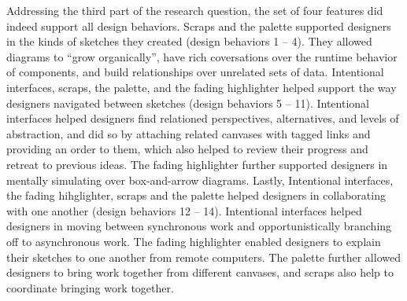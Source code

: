 Addressing the third part of the research question, the set of four features did indeed support all design behaviors. Scraps and the palette supported designers in the kinds of sketches they created (design behaviors 1 -- 4). They allowed diagrams to ``grow organically'', have rich coversations over the runtime behavior of components, and build relationships over unrelated sets of data. Intentional interfaces, scraps, the palette, and the fading highlighter helped support the way designers navigated between sketches (design behaviors 5 -- 11). Intentional interfaces helped designers find relationed perspectives, alternatives, and levels of abstraction, and did so by attaching related canvases with tagged links and providing an order to them, which also helped to review their progress and retreat to previous ideas. The fading highlighter further supported designers in mentally simulating over box-and-arrow diagrams. Lastly, Intentional interfaces, the fading hihglighter, scraps and the palette helped designers in collaborating with one another (design behaviors 12 -- 14). Intentional interfaces helped designers in moving between synchronous work and opportunistically branching off to asynchronous work. The fading highlighter enabled designers to explain their sketches to one another from remote computers. The palette further allowed designers to bring work together from different canvases, and scraps also help to coordinate bringing work together.





%
%

